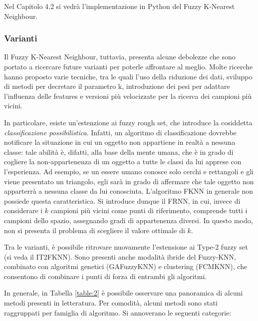 \documentclass[11pt]{article}
\begin{document}
Nel Capitolo 4.2 si vedrà l'implementazione in Python del Fuzzy K-Nearest Neighbour. 


\subsubsection{Varianti}

Il Fuzzy K-Nearest Neighbour, tuttavia, presenta alcune debolezze che sono portato a ricercare future varianti per poterle affrontare al meglio. Molte ricerche hanno proposto varie tecniche, tra le quali l'uso della riduzione dei dati, sviluppo di metodi per decretare il parametro k, introduzione dei pesi per adattare l'influenza delle features e versioni più velocizzate per la ricerca dei campioni più vicini. 

In particolare, esiste un'estenzione ai fuzzy rough set, che introduce la cosiddetta \textit{classificazione possibilistica}. Infatti, un algoritmo di classificazione dovrebbe notificare la situazione in cui un oggetto non appartiene in realtà a nessuna classe: tale abilità è, difatti, alla base della mente umana, che è in grado di cogliere la non-appartenenza di un oggetto a tutte le classi da lui apprese con l'esperienza. Ad esempio, se un essere umano conosce solo cerchi e rettangoli e gli viene presentato un triangolo, egli sarà in grado di affermare che tale oggetto non apparterrà a nessuna classe da lui conosciuta. L'algoritmo FKNN in generale non possiede questa caratteristica. Si introduce dunque il FRNN, in cui, invece di considerare i $k$ campioni più vicini come punti di riferimento, comprende tutti i campioni dello spazio, assegnando gradi di appartenenza diversi. In questo modo, non si presenta il problema di scegliere il valore ottimale di $k$. 

Tra le varianti, è possibile ritrovare nuovamente l'estensione ai Type-2 fuzzy set (si veda il IT2FKNN). Sono presenti anche modalità ibride del Fuzzy-KNN, combinato con algoritmi genetici (GAFuzzyKNN) e clustering (FCMKNN), che consentono di combinare i punti di forza di entrambi gli algoritmi. 

In generale, in Tabella \ref{table:2} è possibile osservare una panoramica di alcuni metodi presenti in letteratura. Per comodità, alcuni metodi sono stati raggruppati per famiglia di algoritmo. Si annoverano le seguenti categorie: 
\end{document}

